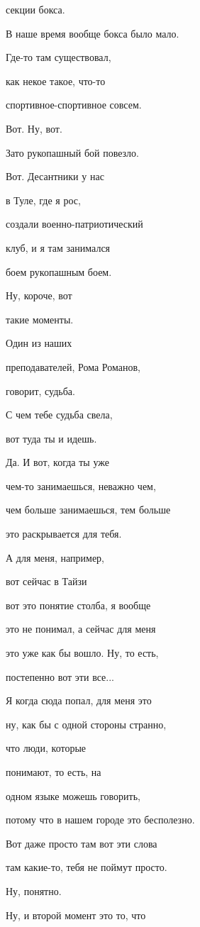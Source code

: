 секции бокса.

В наше время вообще бокса было мало.

Где-то там существовал,

как некое такое, что-то

спортивное-спортивное совсем.

Вот. Ну, вот.

Зато рукопашный бой повезло.

Вот. Десантники у нас

в Туле, где я рос,

создали военно-патриотический

клуб, и я там занимался

боем рукопашным боем.

Ну, короче, вот

такие моменты.

Один из наших

преподавателей, Рома Романов,

говорит, судьба.

С чем тебе судьба свела,

вот туда ты и идешь.

Да. И вот, когда ты уже

чем-то занимаешься, неважно чем,

чем больше занимаешься, тем больше

это раскрывается для тебя.

А для меня, например,

вот сейчас в Тайзи

вот это понятие столба, я вообще

это не понимал, а сейчас для меня

это уже как бы вошло. Ну, то есть,

постепенно вот эти все...

Я когда сюда попал, для меня это

ну, как бы с одной стороны странно,

что люди, которые

понимают, то есть, на

одном языке можешь говорить,

потому что в нашем городе это бесполезно.

Вот даже просто там вот эти слова

там какие-то, тебя не поймут просто.

Ну, понятно.

Ну, и второй момент это то, что

